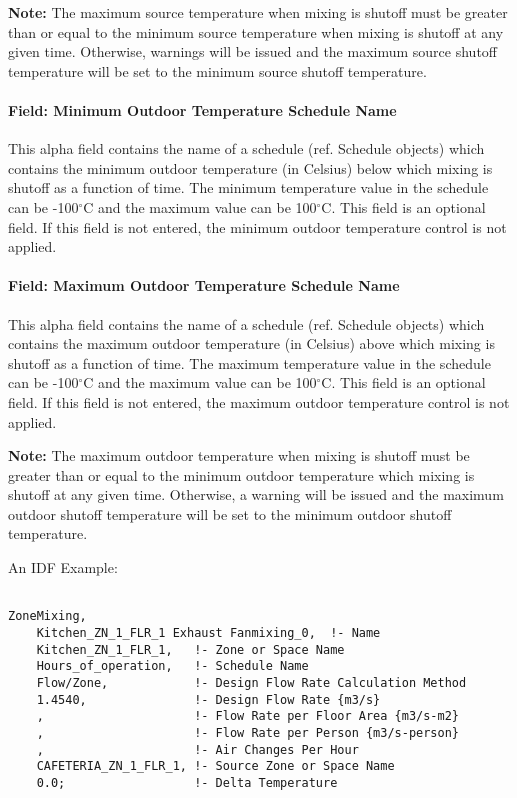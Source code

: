 \textbf{Note:} The maximum source temperature when mixing is shutoff must be greater than or equal to the minimum source temperature when mixing is shutoff at any given time. Otherwise, warnings will be issued and the maximum source shutoff temperature will be set to the minimum source shutoff temperature.

\paragraph{Field: Minimum Outdoor Temperature Schedule Name}\label{field-minimum-outdoor-temperature-schedule-name-2}

This alpha field contains the name of a schedule (ref. Schedule objects) which contains the minimum outdoor temperature (in Celsius) below which mixing is shutoff as a function of time. The minimum temperature value in the schedule can be -100$^\circ$C and the maximum value can be 100$^\circ$C. This field is an optional field. If this field is not entered, the minimum outdoor temperature control is not applied.

\paragraph{Field: Maximum Outdoor Temperature Schedule Name}\label{field-maximum-outdoor-temperature-schedule-name-2}

This alpha field contains the name of a schedule (ref. Schedule objects) which contains the maximum outdoor temperature (in Celsius) above which mixing is shutoff as a function of time. The maximum temperature value in the schedule can be -100$^\circ$C and the maximum value can be 100$^\circ$C. This field is an optional field. If this field is not entered, the maximum outdoor temperature control is not applied.

\textbf{Note:} The maximum outdoor temperature when mixing is shutoff must be greater than or equal to the minimum outdoor temperature which mixing is shutoff at any given time. Otherwise, a warning will be issued and the maximum outdoor shutoff temperature will be set to the minimum outdoor shutoff temperature.

An IDF Example:

\begin{lstlisting}

ZoneMixing,
    Kitchen_ZN_1_FLR_1 Exhaust Fanmixing_0,  !- Name
    Kitchen_ZN_1_FLR_1,   !- Zone or Space Name
    Hours_of_operation,   !- Schedule Name
    Flow/Zone,            !- Design Flow Rate Calculation Method
    1.4540,               !- Design Flow Rate {m3/s}
    ,                     !- Flow Rate per Floor Area {m3/s-m2}
    ,                     !- Flow Rate per Person {m3/s-person}
    ,                     !- Air Changes Per Hour
    CAFETERIA_ZN_1_FLR_1, !- Source Zone or Space Name
    0.0;                  !- Delta Temperature
\end{lstlisting}

